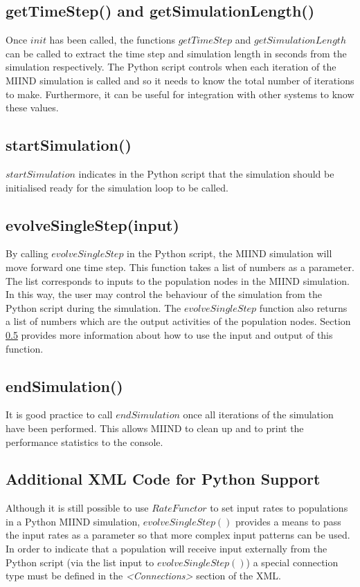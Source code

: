 \documentclass[utf8]{frontiersSCNS} %
\begin{document}
\subsection{getTimeStep() and getSimulationLength()}
Once $init$ has been called, the functions $getTimeStep$ and $getSimulationLength$ can be called to extract the time step and simulation length in seconds from the simulation respectively. The Python script controls when each iteration of the MIIND simulation is called and so it needs to know the total number of iterations to make. Furthermore, it can be useful for integration with other systems to know these values.

\subsection{startSimulation()}
$startSimulation$ indicates in the Python script that the simulation should be initialised ready for the simulation loop to be called.

\subsection{evolveSingleStep(input)}
By calling $evolveSingleStep$ in the Python script, the MIIND simulation will move forward one time step. This function takes a list of numbers as a parameter. The list corresponds to inputs to the population nodes in the MIIND simulation. In this way, the user may control the behaviour of the simulation from the Python script during the simulation. The $evolveSingleStep$ function also returns a list of numbers which are the output activities of the population nodes. Section \ref{externalconnections} provides more information about how to use the input and output of this function.

\subsection{endSimulation()}
It is good practice to call $endSimulation$ once all iterations of the simulation have been performed. This allows MIIND to clean up and to print the performance statistics to the console.

\subsection{Additional XML Code for Python Support}
\label{externalconnections}
Although it is still possible to use $RateFunctor$ to set input rates to populations in a Python MIIND simulation, $evolveSingleStep()$ provides a means to pass the input rates as a parameter so that more complex input patterns can be used. In order to indicate that a population will receive input externally from the Python script (via the list input to $evolveSingleStep()$) a special connection type must be defined in the \textit{\textless Connections\textgreater} section of the XML.
\end{document}
